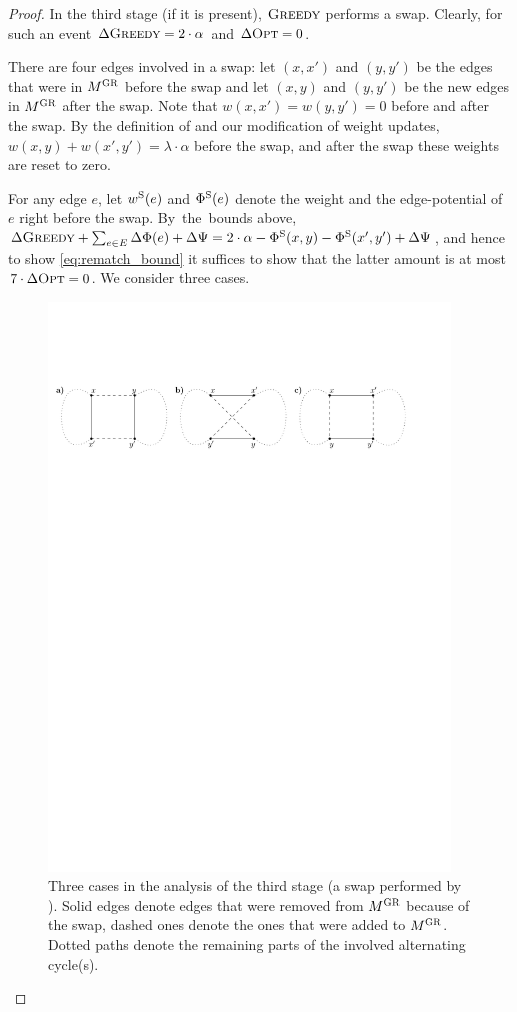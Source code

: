 \begin{proof}
In the third stage (if it is present), $\textsc{Greedy}$ performs a swap. Clearly, for
such an event $\Delta \textsc{Greedy} = 2 \cdot \alpha$ and $\Delta \textsc{Opt} = 0$. 

There are four edges involved in a swap: let $(x,x')$ and $(y,y')$ be the
edges that were in $M^\textsc{GR}$ before the swap and let $(x,y)$ and $(y,y')$ be
the new edges in $M^\textsc{GR}$ after the swap. Note that $w(x,x') = w(y,y') = 0$
before and after the swap. By the definition of \GREEDY and our modification
of weight updates, $w(x,y) + w(x',y') = \lambda
\cdot \alpha$ before the swap, and after the swap these weights are reset to
zero.

For any edge $e$, let $w^\textrm{S}(e)$ and $\Phi^\textrm{S}(e)$ denote the weight and the
edge-potential of~$e$ right before the swap. By~the~bounds above, $\Delta
\textsc{Greedy} + \sum_{e \in E} \Delta \Phi(e) + \Delta\Psi = 2 \cdot \alpha -
\Phi^\textrm{S}(x,y) - \Phi^\textrm{S}(x',y') + \Delta \Psi$, and hence to show
\eqref{eq:rematch_bound} it suffices to show that the latter amount is at most
$7 \cdot \Delta \textsc{Opt} = 0$. We consider three cases.

\begin{figure}
\centering
\includegraphics[width=0.95\textwidth]{figs/dynamic-mapping/fig_rematch}
\caption{Three cases in the analysis of the third stage (a swap performed by
\GREEDY). Solid edges denote edges that were removed from $M^\textsc{GR}$ because
of the swap, dashed ones denote the ones that were added to $M^\textsc{GR}$. Dotted
paths denote the remaining parts of the involved alternating cycle(s).}
\label{fig:rematch}
\end{figure}


\end{proof}
